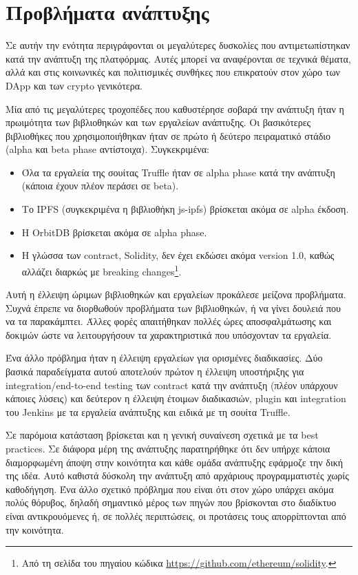 \section{Προβλήματα ανάπτυξης} \label{section:4-4-problems-faced}

Σε αυτήν την ενότητα περιγράφονται οι μεγαλύτερες δυσκολίες που αντιμετωπίστηκαν κατά την ανάπτυξη της πλατφόρμας. Αυτές μπορεί να αναφέρονται σε τεχνικά θέματα, αλλά και στις κοινωνικές και πολιτισμικές συνθήκες που επικρατούν στον χώρο των DApp και των crypto γενικότερα.

\newpage
Μία από τις μεγαλύτερες τροχοπέδες που καθυστέρησε σοβαρά την ανάπτυξη ήταν η πρωιμότητα των βιβλιοθηκών και των εργαλείων ανάπτυξης. Οι βασικότερες βιβλιοθήκες που χρησιμοποιήθηκαν ήταν σε πρώτο ή δεύτερο πειραματικό στάδιο (alpha και beta phase αντίστοιχα). Συγκεκριμένα:

\begin{itemize}
	\item Όλα τα εργαλεία της σουίτας Truffle ήταν σε alpha phase κατά την ανάπτυξη (κάποια έχουν πλέον περάσει σε beta).
	\item Το IPFS (συγκεκριμένα η βιβλιοθήκη js-ipfs) βρίσκεται ακόμα σε alpha έκδοση.
	\item Η OrbitDB βρίσκεται ακόμα σε alpha phase.
	\item Η γλώσσα των contract, Solidity, δεν έχει εκδώσει ακόμα version 1.0, καθώς αλλάζει διαρκώς με breaking changes\footnote{Από τη σελίδα του πηγαίου κώδικα \url{https://github.com/ethereum/solidity}.}.
\end{itemize}

Αυτή η έλλειψη ώριμων βιβλιοθηκών και εργαλείων προκάλεσε μείζονα προβλήματα. Συχνά έπρεπε να διορθωθούν προβλήματα των βιβλιοθηκών, ή να γίνει δουλειά που να τα παρακάμπτει. Άλλες φορές απαιτήθηκαν πολλές ώρες αποσφαλμάτωσης και δοκιμών ώστε να λειτουργήσουν τα χαρακτηριστικά που υπόσχονταν τα εργαλεία.

Ένα άλλο πρόβλημα ήταν η έλλειψη εργαλείων για ορισμένες διαδικασίες. Δύο βασικά παραδείγματα αυτού αποτελούν πρώτον η έλλειψη υποστήριξης για integration/end-to-end testing των contract κατά την ανάπτυξη (πλέον υπάρχουν κάποιες λύσεις) και δεύτερον η έλλειψη έτοιμων διαδικασιών, plugin και integration του Jenkins με τα εργαλεία ανάπτυξης και ειδικά με τη σουίτα Truffle.

Σε παρόμοια κατάσταση βρίσκεται και η γενική συναίνεση σχετικά με τα best practices. Σε διάφορα μέρη της ανάπτυξης παρατηρήθηκε ότι δεν υπήρχε κάποια διαμορφωμένη άποψη στην κοινότητα και κάθε ομάδα ανάπτυξης εφάρμοζε την δική της ιδέα. Αυτό καθιστά δύσκολη την ανάπτυξη από αρχάριους προγραμματιστές χωρίς καθοδήγηση. Ένα άλλο σχετικό πρόβλημα που είναι ότι στον χώρο υπάρχει ακόμα πολύς θόρυβος, δηλαδή σημαντικό μέρος των πηγών που βρίσκονται στο διαδίκτυο είναι αντικρουόμενες ή, σε πολλές περιπτώσεις, οι προτάσεις τους απορρίπτονται από την κοινότητα.

